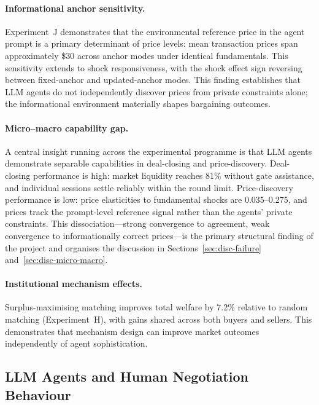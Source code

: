 \paragraph{Informational anchor sensitivity.}
Experiment~J demonstrates that the environmental reference price in the agent prompt is a primary determinant of price levels: mean transaction prices span approximately \$30 across anchor modes under identical fundamentals.  This sensitivity extends to shock responsiveness, with the shock effect sign reversing between fixed-anchor and updated-anchor modes.  This finding establishes that LLM agents do not independently discover prices from private constraints alone; the informational environment materially shapes bargaining outcomes.

\paragraph{Micro--macro capability gap.}
A central insight running across the experimental programme is that LLM agents demonstrate separable capabilities in deal-closing and price-discovery.  Deal-closing performance is high: market liquidity reaches 81\% without gate assistance, and individual sessions settle reliably within the round limit.  Price-discovery performance is low: price elasticities to fundamental shocks are 0.035--0.275, and prices track the prompt-level reference signal rather than the agents' private constraints.  This dissociation---strong convergence to agreement, weak convergence to informationally correct prices---is the primary structural finding of the project and organises the discussion in Sections~\ref{sec:disc-failure} and~\ref{sec:disc-micro-macro}.

\paragraph{Institutional mechanism effects.}
Surplus-maximising matching improves total welfare by 7.2\% relative to random matching (Experiment~H), with gains shared across both buyers and sellers.  This demonstrates that mechanism design can improve market outcomes independently of agent sophistication.

\subsection{LLM Agents and Human Negotiation Behaviour}
\label{sec:disc-human}

